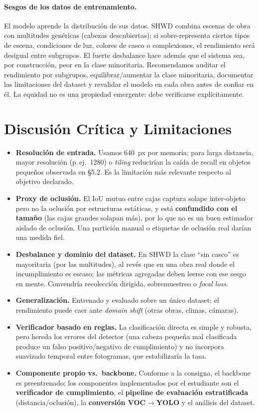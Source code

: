 \documentclass{article}
\begin{document}
\paragraph{Sesgos de los datos de entrenamiento.}
El modelo aprende la distribución de sus datos. SHWD combina escenas de obra con
multitudes genéricas (cabezas descubiertas); si sobre-representa ciertos tipos de
escena, condiciones de luz, colores de casco o complexiones, el rendimiento será
desigual entre subgrupos. El fuerte desbalance hace además que el sistema sea, por
construcción, peor en la clase minoritaria. Recomendamos auditar el rendimiento por
subgrupos, equilibrar/aumentar la clase minoritaria, documentar las limitaciones
del dataset y revalidar el modelo en cada obra antes de confiar en él. La equidad
no es una propiedad emergente: debe verificarse explícitamente.

\section{Discusión Crítica y Limitaciones}
\label{sec:lim}
\begin{itemize}
  \item \textbf{Resolución de entrada.} Usamos 640~px por memoria; para larga
  distancia, mayor resolución (p.\,ej.\ 1280) o \emph{tiling} reducirían la caída
  de recall en objetos pequeños observada en \S5.2. Es la limitación más relevante
  respecto al objetivo declarado.
  \item \textbf{Proxy de oclusión.} El IoU mutuo entre cajas captura solape
  inter-objeto pero no la oclusión por estructuras estáticas, y está
  \textbf{confundido con el tamaño} (las cajas grandes solapan más), por lo que no
  es un buen estimador aislado de oclusión. Una partición manual o etiquetas de
  oclusión real darían una medida fiel.
  \item \textbf{Desbalance y dominio del dataset.} En SHWD la clase ``sin casco''
  es mayoritaria (por las multitudes), al revés que en una obra real donde el
  incumplimiento es escaso; las métricas agregadas deben leerse con ese sesgo en
  mente. Convendría recolección dirigida, sobremuestreo o \emph{focal loss}.
  \item \textbf{Generalización.} Entrenado y evaluado sobre un único dataset; el
  rendimiento puede caer ante \emph{domain shift} (otras obras, climas, cámaras).
  \item \textbf{Verificador basado en reglas.} La clasificación directa es simple y
  robusta, pero hereda los errores del detector (una cabeza pequeña mal clasificada
  produce un falso positivo/negativo de cumplimiento) y no incorpora suavizado
  temporal entre fotogramas, que estabilizaría la tasa.
  \item \textbf{Componente propio vs.\ backbone.} Conforme a la consigna, el
  backbone es preentrenado; los componentes implementados por el estudiante son el
  \textbf{verificador de cumplimiento}, el \textbf{pipeline de evaluación
  estratificada} (distancia/oclusión), la \textbf{conversión VOC$\to$YOLO} y el
  análisis del dataset.
\end{itemize}
\end{document}
